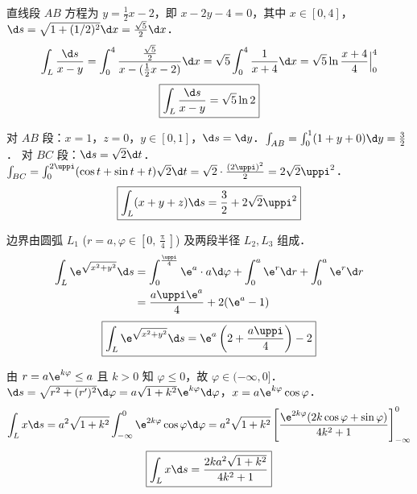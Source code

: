 \begin{solution}

    直线段 $AB$ 方程为 $y = \frac{1}{2}x - 2$，即 $x-2y-4=0$，其中 $x \in [0, 4]$，$\d s = \sqrt{1+(1/2)^{2}} \d x = \frac{\sqrt{5}}{2} \d x$．
    \begin{equation}
        \int_{L} \frac{\d s}{x-y} = \int_{0}^{4} \frac{\frac{\sqrt{5}}{2}}{x - (\frac{1}{2}x - 2)} \d x = \sqrt{5} \int_{0}^{4} \frac{1}{x+4} \d x = \sqrt{5} \ln \frac{x+4}{4} \Big|_{0}^{4}
    \end{equation}
    \begin{equation}
        \boxed{\int_{L} \frac{\d s}{x-y} = \sqrt{5} \ln 2}
    \end{equation}


    对 $AB$ 段：$x=1$，$z=0$，$y \in [0, 1]$，$\d s = \d y$．$\int_{AB} = \int_{0}^{1}(1+y+0) \d y = \frac{3}{2}$．
    对 $BC$ 段：$\d s = \sqrt{2} \d t$．$\int_{BC} = \int_{0}^{2 \uppi}(\cos t + \sin t + t) \sqrt{2} \d t = \sqrt{2} \cdot \frac{(2 \uppi)^{2}}{2} = 2 \sqrt{2} \uppi^{2}$．
    \begin{equation}
        \boxed{\int_{L}(x+y+z) \d s = \frac{3}{2} + 2 \sqrt{2} \uppi^{2}}
    \end{equation}


    边界由圆弧 $L_{1}$ ($r=a, \varphi \in [0, \frac{\uppi}{4}]$) 及两段半径 $L_{2}, L_{3}$ 组成．
    \begin{equation}
        \begin{aligned}
            \int_{L} \e^{\sqrt{x^{2}+y^{2}}} \d s & = \int_{0}^{\frac{\uppi}{4}} \e^{a} \cdot a \d \varphi + \int_{0}^{a} \e^{r} \d r + \int_{0}^{a} \e^{r} \d r \\
                                                  & = \frac{a \uppi \e^{a}}{4} + 2(\e^{a}-1)
        \end{aligned}
    \end{equation}
    \begin{equation}
        \boxed{\int_{L} \e^{\sqrt{x^{2}+y^{2}}} \d s = \e^{a}\left(2 + \frac{a \uppi}{4}\right) - 2}
    \end{equation}


    由 $r = a \e^{k \varphi} \le a$ 且 $k>0$ 知 $\varphi \le 0$，故 $\varphi \in (-\infty, 0]$．
    $\d s = \sqrt{r^{2} + (r')^{2}} \d \varphi = a \sqrt{1+k^{2}} \e^{k \varphi} \d \varphi$，$x = a \e^{k \varphi} \cos \varphi$．
    \begin{equation}
        \int_{L} x \d s = a^{2} \sqrt{1+k^{2}} \int_{-\infty}^{0} \e^{2k \varphi} \cos \varphi \d \varphi = a^{2} \sqrt{1+k^{2}} \left[ \frac{\e^{2k \varphi}(2k \cos \varphi + \sin \varphi)}{4k^{2}+1} \right]_{-\infty}^{0}
    \end{equation}
    \begin{equation}
        \boxed{\int_{L} x \d s = \frac{2 k a^{2} \sqrt{1+k^{2}}}{4 k^{2}+1}}
    \end{equation}


\end{solution}
